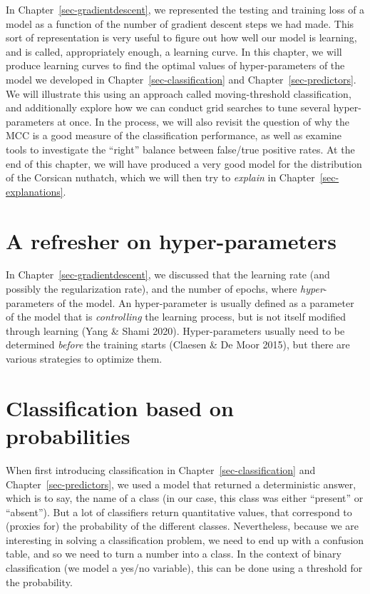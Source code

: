 \documentclass[
  letterpaper,
]{scrbook}
\begin{document}
In Chapter~\ref{sec-gradientdescent}, we represented the testing and
training loss of a model as a function of the number of gradient descent
steps we had made. This sort of representation is very useful to figure
out how well our model is learning, and is called, appropriately enough,
a learning curve. In this chapter, we will produce learning curves to
find the optimal values of hyper-parameters of the model we developed in
­Chapter~\ref{sec-classification} and Chapter~\ref{sec-predictors}. We
will illustrate this using an approach called moving-threshold
classification, and additionally explore how we can conduct grid
searches to tune several hyper-parameters at once. In the process, we
will also revisit the question of why the MCC is a good measure of the
classification performance, as well as examine tools to investigate the
``right'' balance between false/true positive rates. At the end of this
chapter, we will have produced a very good model for the distribution of
the Corsican nuthatch, which we will then try to \emph{explain} in
Chapter~\ref{sec-explanations}.

\section{A refresher on
hyper-parameters}\label{a-refresher-on-hyper-parameters}

In Chapter~\ref{sec-gradientdescent}, we discussed that the learning
rate (and possibly the regularization rate), and the number of epochs,
where \emph{hyper}-parameters of the model. An hyper-parameter is
usually defined as a parameter of the model that is \emph{controlling}
the learning process, but is not itself modified through learning (Yang
\& Shami 2020). Hyper-parameters usually need to be determined
\emph{before} the training starts (Claesen \& De Moor 2015), but there
are various strategies to optimize them.

\section{Classification based on
probabilities}\label{classification-based-on-probabilities}

When first introducing classification in
Chapter~\ref{sec-classification} and Chapter~\ref{sec-predictors}, we
used a model that returned a deterministic answer, which is to say, the
name of a class (in our case, this class was either ``present'' or
``absent''). But a lot of classifiers return quantitative values, that
correspond to (proxies for) the probability of the different classes.
Nevertheless, because we are interesting in solving a classification
problem, we need to end up with a confusion table, and so we need to
turn a number into a class. In the context of binary classification (we
model a yes/no variable), this can be done using a threshold for the
probability.
\end{document}
